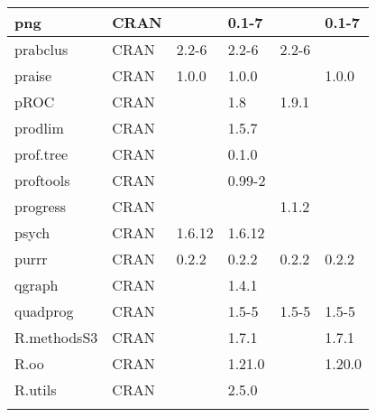 \begin{longtable}{|llllll|}
png                           & CRAN                      &             & 0.1-7       &                & 0.1-7             \\ \hline \rowcolor{gray!25}
prabclus                      & CRAN                      & 2.2-6       & 2.2-6       & 2.2-6          &                  \\ \hline
praise                        & CRAN                      & 1.0.0       & 1.0.0       &                & 1.0.0             \\ \hline \rowcolor{gray!25}
pROC                          & CRAN                      &             & 1.8         & 1.9.1          &                  \\ \hline
prodlim                       & CRAN                      &             & 1.5.7       &                &                   \\ \hline \rowcolor{gray!25}
prof.tree                     & CRAN                      &             & 0.1.0       &                &                  \\ \hline
proftools                     & CRAN                      &             & 0.99-2      &                &                   \\ \hline \rowcolor{gray!25}
progress                      & CRAN                      &             &             & 1.1.2          &                  \\ \hline
psych                         & CRAN                      & 1.6.12      & 1.6.12      &                &                   \\ \hline \rowcolor{gray!25}
purrr                         & CRAN                      & 0.2.2       & 0.2.2       & 0.2.2          & 0.2.2            \\ \hline
qgraph                        & CRAN                      &             & 1.4.1       &                &                   \\ \hline \rowcolor{gray!25}
quadprog                      & CRAN                      &             & 1.5-5       & 1.5-5          & 1.5-5            \\ \hline
R.methodsS3                   & CRAN                      &             & 1.7.1       &                & 1.7.1             \\ \hline \rowcolor{gray!25}
R.oo                          & CRAN                      &             & 1.21.0      &                & 1.20.0           \\ \hline
R.utils                       & CRAN                      &             & 2.5.0       &                &                   \\ \hline \rowcolor{gray!25}

\end{longtable}
